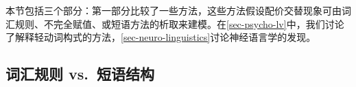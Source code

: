 \begin{exe}
\begin{xlist}[iv.]
\begin{exe}
\begin{xlist}[iv.]
本节包括三个部分：第一部分比较了一些方法，这些方法假设配价交替现象可由词汇规则、不完全赋值、或短语方法的析取来建模。在\ref{sec-psycho-lv}中，我们讨论了解释轻动词构式的方法，\ref{sec-neuro-linguistics}讨论神经语言学的发现。

\subsection{词汇规则 vs.\ 短语结构}
\label{sec-lr-phrasal-psycho}


\end{xlist}
\end{exe}
\end{xlist}
\end{exe}
